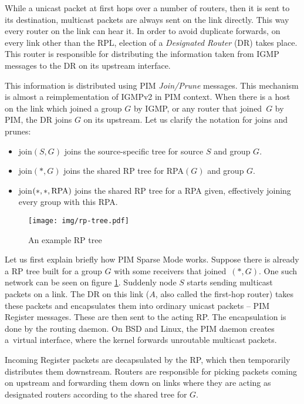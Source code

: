 While a unicast packet at first hops over a number of routers, then it is sent to
its destination, multicast packets are always sent on the link directly. This
way every router on the link can hear it. In order to avoid duplicate forwards, on
every link other than the RPL, election of a \emph{Designated Router} (DR)
takes place. This router is responsible for distributing
the information taken from IGMP messages to the DR on its upstream interface.

\pagebreak[4]

This information is distributed using PIM \emph{Join/Prune} messages. This
mechanism is almost a reimplementation of IGMPv2 in PIM context. When there is
a host on the link which joined a group $G$ by IGMP, or any router that joined~$G$ by
PIM, the DR joins $G$ on its upstream. Let us clarify the notation for joins and prunes:

\begin{itemize}
  \item join$(S, G)$ joins the source-specific tree for source $S$ and group $G$.
  \item join$(*, G)$ joins the shared RP tree for RPA$(G)$ and group $G$.
  \item join$(*, *, \hbox{RPA})$ joins the shared RP tree for a RPA given, effectively
    joining every group with this RPA.
\end{itemize}

\begin{figure}[htp]
\centering
\texttt{[image: img/rp-tree.pdf]}
\caption{An example RP tree}
\label{rp-tree}
\end{figure}

Let us first explain briefly how PIM Sparse Mode works. Suppose there is
already a RP tree built for a group $G$ with some receivers that joined~$(*,G)$.
One such network can be seen on figure \ref{rp-tree}.
Suddenly node $S$ starts sending multicast packets on a link. The DR on
this link ($A$, also called the first-hop router) takes these packets and
encapsulates them into ordinary unicast packets -- PIM Register messages. These
are then sent to the acting RP. The encapsulation is done by the routing
daemon. On BSD and Linux, the PIM daemon creates a~virtual interface, where the
kernel forwards unroutable multicast packets.

Incoming Register packets are decapsulated by the RP, which then temporarily
distributes them downstream. Routers are responsible for picking packets coming
on upstream and forwarding them down on links where they are acting as
designated routers according to the shared tree for $G$.

